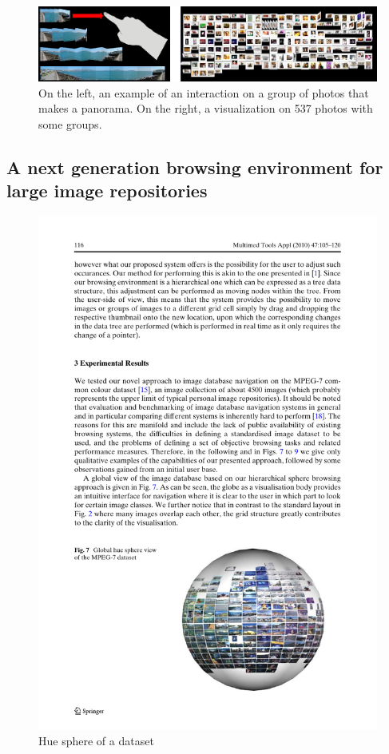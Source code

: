 \begin{figure}[ht]
	\centering
		\includegraphics[width=\textwidth]{imgs-RelatedWork/hsu.png}
	\caption{On the left, an example of an interaction on a group of photos that makes a panorama. On the right, a visualization on 537 photos with some groups.}
	\label{fig:hsu1}
\end{figure}



\subsection{A next generation browsing environment for large image repositories} %
\label{sub:Schaefer}

\begin{figure}[ht]
	\centering
		\includegraphics[scale=1]{imgs-RelatedWork/shaefer1.pdf}
	\caption{Hue sphere of a dataset}
	\label{fig:schaefer1}
\end{figure}

